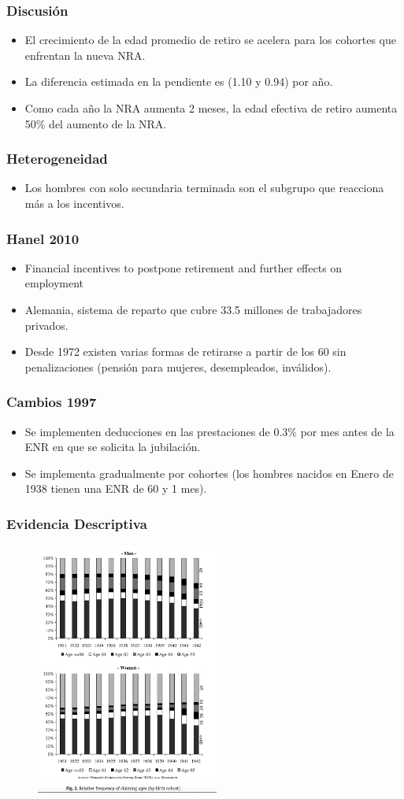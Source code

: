 \documentclass{beamer}
\begin{document}
  \frame
  {
    \frametitle{Discusión}
    \begin{itemize}
      \item El crecimiento de la edad promedio de retiro se acelera para los cohortes que enfrentan la nueva NRA.
      \item La diferencia estimada en la pendiente es (1.10 y 0.94) por año.
      \item Como cada año la NRA aumenta 2 meses, la edad efectiva de retiro aumenta 50\% del aumento de la NRA.
    \end{itemize}
  }
  \frame
  {
    \frametitle{Heterogeneidad}
    
    \begin{itemize}
    
    \item Los hombres con solo secundaria terminada son el subgrupo que reacciona más a los incentivos.
    \end{itemize}
  }
  \frame
  {
    \frametitle{Hanel 2010}
    \begin{itemize}
    \item Financial incentives to postpone retirement and further effects on employment
    \item Alemania, sistema de reparto que cubre 33.5 millones de trabajadores privados.
    \item Desde 1972 existen varias formas de retirarse a partir de los 60 sin penalizaciones (pensión para mujeres, desempleados, inválidos).
    \end{itemize}
  }
  \frame
  {
    \frametitle{Cambios 1997}
    \begin{itemize}
      \item Se implementen deducciones en las prestaciones de 0.3\% por mes antes de la ENR en que se solicita la jubilación.
      \item Se implementa gradualmente por cohortes (los hombres nacidos en Enero de 1938 tienen una ENR de 60 y 1 mes).
    \end{itemize}
  }
  \frame
  {
    \frametitle{Evidencia Descriptiva}
      \begin{figure}[htp]
        \centering
        \includegraphics[width=6cm]{imgs/hanel10-fig2}
        \label{fig:fig2}
      \end{figure}
  }
\end{document}

